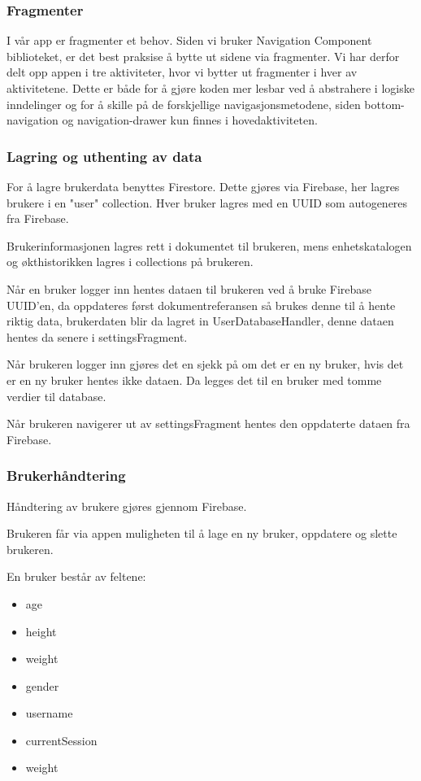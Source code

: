 \subsubsection{Fragmenter}
I vår app er fragmenter et behov. Siden vi bruker Navigation Component biblioteket, er det best praksise å bytte ut sidene via fragmenter. Vi har derfor delt opp appen i tre aktiviteter, hvor vi bytter ut fragmenter i hver av aktivitetene. Dette er både for å gjøre koden mer lesbar ved å abstrahere i logiske inndelinger og for å skille på de forskjellige navigasjonsmetodene, siden bottom-navigation og navigation-drawer kun finnes i hovedaktiviteten.

\subsubsection{Lagring og uthenting av data}
For å lagre brukerdata benyttes Firestore. Dette gjøres via Firebase, her lagres brukere i en "user" collection. Hver bruker lagres med en UUID som autogeneres fra Firebase. 

Brukerinformasjonen lagres rett i dokumentet til brukeren, mens enhetskatalogen og økthistorikken lagres i collections på brukeren. 

Når en bruker logger inn hentes dataen til brukeren ved å bruke Firebase UUID'en, da oppdateres først dokumentreferansen så brukes denne til å hente riktig data, brukerdaten blir da lagret in UserDatabaseHandler, denne dataen hentes da senere i settingsFragment. 

Når brukeren logger inn gjøres det en sjekk på om det er en ny bruker, hvis det er en ny bruker hentes ikke dataen. 
Da legges det til en bruker med tomme verdier til database. 

Når brukeren navigerer ut av settingsFragment hentes den oppdaterte dataen fra Firebase.

\subsubsection{Brukerhåndtering}
Håndtering av brukere gjøres gjennom Firebase.

Brukeren får via appen muligheten til å lage en ny bruker, oppdatere og slette brukeren.

En bruker består av feltene:
\begin{itemize}
    \item age
    \item height
    \item weight
    \item gender
    \item username
    \item currentSession
    \item weight
\end{itemize}

